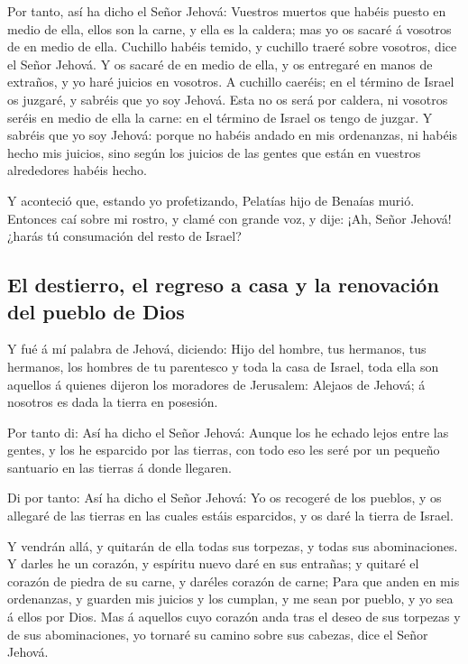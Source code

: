  Por tanto, así ha dicho el Señor Jehová: Vuestros muertos
que habéis puesto en medio de ella, ellos son la carne, y ella es la
caldera; mas yo os sacaré á vosotros de en medio de ella. 
Cuchillo habéis temido, y cuchillo traeré sobre vosotros, dice el Señor
Jehová.  Y os sacaré de en medio de ella, y os entregaré en
manos de extraños, y yo haré juicios en vosotros.  A
cuchillo caeréis; en el término de Israel os juzgaré, y sabréis que yo
soy Jehová.  Esta no os será por caldera, ni vosotros
seréis en medio de ella la carne: en el término de Israel os tengo de
juzgar.  Y sabréis que yo soy Jehová: porque no habéis
andado en mis ordenanzas, ni habéis hecho mis juicios, sino según los
juicios de las gentes que están en vuestros alrededores habéis hecho.

 Y aconteció que, estando yo profetizando, Pelatías hijo de
Benaías murió. Entonces caí sobre mi rostro, y clamé con grande voz, y
dije: ¡Ah, Señor Jehová! ¿harás tú consumación del resto de Israel?

\hypertarget{el-destierro-el-regreso-a-casa-y-la-renovaciuxf3n-del-pueblo-de-dios}{%
\subsection{El destierro, el regreso a casa y la renovación del pueblo
de
Dios}\label{el-destierro-el-regreso-a-casa-y-la-renovaciuxf3n-del-pueblo-de-dios}}

 Y fué á mí palabra de Jehová, diciendo:  Hijo
del hombre, tus hermanos, tus hermanos, los hombres de tu parentesco y
toda la casa de Israel, toda ella son aquellos á quienes dijeron los
moradores de Jerusalem: Alejaos de Jehová; á nosotros es dada la tierra
en posesión.

 Por tanto di: Así ha dicho el Señor Jehová: Aunque los he
echado lejos entre las gentes, y los he esparcido por las tierras, con
todo eso les seré por un pequeño santuario en las tierras á donde
llegaren.

 Di por tanto: Así ha dicho el Señor Jehová: Yo os recogeré
de los pueblos, y os allegaré de las tierras en las cuales estáis
esparcidos, y os daré la tierra de Israel.

 Y vendrán allá, y quitarán de ella todas sus torpezas, y
todas sus abominaciones.  Y darles he un corazón, y
espíritu nuevo daré en sus entrañas; y quitaré el corazón de piedra de
su carne, y daréles corazón de carne;  Para que anden en
mis ordenanzas, y guarden mis juicios y los cumplan, y me sean por
pueblo, y yo sea á ellos por Dios.  Mas á aquellos cuyo
corazón anda tras el deseo de sus torpezas y de sus abominaciones, yo
tornaré su camino sobre sus cabezas, dice el Señor Jehová.

